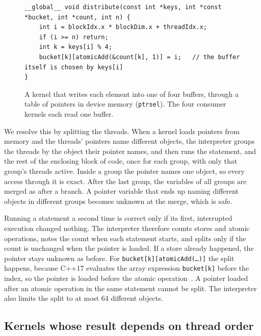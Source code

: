 \documentclass[11pt]{article}
\newcommand{\code}[1]{\texttt{#1}}
\begin{document}
\begin{figure}[tbp]
\begin{lstlisting}
__global__ void distribute(const int *keys, int *const *bucket, int *count, int n) {
    int i = blockIdx.x * blockDim.x + threadIdx.x;
    if (i >= n) return;
    int k = keys[i] % 4;
    bucket[k][atomicAdd(&count[k], 1)] = i;   // the buffer itself is chosen by keys[i]
}
\end{lstlisting}
\caption{A kernel that writes each element into one of four buffers, through a table of pointers in device memory
(\code{ptrsel}). The four consumer kernels each read one buffer.}
\label{fig:ptrsel}
\end{figure}

We resolve this by splitting the threads. When a kernel loads pointers from memory and the threads' pointers name
different objects, the interpreter groups the threads by the object their pointer names, and then runs the
statement, and the rest of the enclosing block of code, once for each group, with only that group's threads
active. Inside a group the pointer names one object, so every access through it is exact. After the last group,
the variables of all groups are merged as after a branch. A pointer variable that ends up naming different objects
in different groups becomes unknown at the merge, which is safe.

Running a statement a second time is correct only if its first, interrupted execution changed nothing. The
interpreter therefore counts stores and atomic operations, notes the count when each statement starts, and splits
only if the count is unchanged when the pointer is loaded. If a store already happened, the pointer stays unknown
as before. For \code{bucket[k][atomicAdd(\ldots)]} the split happens, because C++17 evaluates the array expression
\code{bucket[k]} before the index, so the pointer is loaded before the atomic operation~\cite{cppstd17}. A pointer
loaded after an atomic operation in the same statement cannot be split. The interpreter also limits the split to
at most 64 different objects.

\subsection{Kernels whose result depends on thread order}
\label{sec:schedules}
\end{document}
